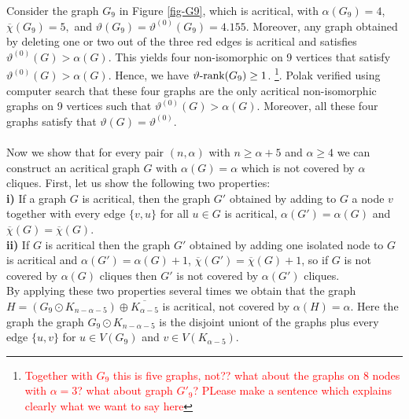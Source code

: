 \documentclass[11pt]{article}
\newcommand{\ignore}[1]{}
\numberwithin{equation}{section}
\newcommand{\rrank}{\vartheta\text{\rm -rank}}
\begin{document}
{	Consider the graph $G_9$ in Figure \ref{fig-G9}, which is acritical, 
	with $\alpha(G_9)=4$, ${\overline{\chi}}(G_9)=5,$ and $ \vartheta(G_9)=\vartheta^{(0)}(G_9)=4.155$. Moreover, any graph obtained by deleting one or two out of the three red edges is acritical and satisfies $\vartheta^{(0)}(G)>\alpha(G)$. This yields four non-isomorphic on 9 vertices that satisfy $\vartheta^{(0)}(G)>\alpha(G)$. Hence, we have $\rrank(G_9)\ge 1$. \footnote{\textcolor{red}{Together with $G_9$ this is five graphs, not?? what about the graphs on  8 nodes with $\alpha=3$? what about graph $G'_9$? PLease make a sentence which explains clearly what we want to say here}}. Polak \cite{Polak}  verified using computer search that these four graphs are  the only acritical non-isomorphic graphs on 9 vertices such that $\vartheta^{(0)}(G)> \alpha(G)$. Moreover, all these four graphs satisfy that $\vartheta(G)=\vartheta^{(0)}$.
	\\
	\\
	Now we show that for every pair $(n,\alpha)$ with $n\geq \alpha+5$ and $\alpha\geq 4$ we can construct an acritical graph $G$ with $\alpha(G)=\alpha$ which is not covered by $\alpha$ cliques. First, let us show the following two properties: 
	\\
	{\bf{i)}} If a graph $G$ is acritical, then the graph $G'$ obtained by adding to $G$ a node $v$ together with every edge $\{v,u\}$ for all $u\in G$  is acritical, $\alpha(G')=\alpha(G)$ and $\overline{\chi}(G)=\overline{\chi}(G)$. 
	\\
	{\bf{ii)}} If $G$ is acritical then the graph $G'$ obtained by adding one isolated node to $G$ is acritical and $\alpha(G')=\alpha(G)+1$, $\overline{\chi}(G')=\overline{\chi}(G)+1$, so if $G$ is not covered by $\alpha(G)$ cliques then $G'$ is not covered by $\alpha(G')$ cliques. 
	\\
	By applying these two properties several times we obtain that the graph  $H=(G_9 \odot K_{n-\alpha-5}) \oplus \overline{K_{\alpha-5}}$ is acritical, not covered by $\alpha(H)=\alpha$. Here the graph the graph $G_9 \odot K_{n-\alpha-5}$ is the disjoint uniont of the graphs plus every edge $\{u,v\}$ for $u\in V(G_9)$ and $v\in V(K_{\alpha-5})$.




\ignore{ 
	\textcolor{red}{Can we claim the same for $\vartheta^{(0)}$? i.e. say something about the rank?}
	
}}
\end{document}

